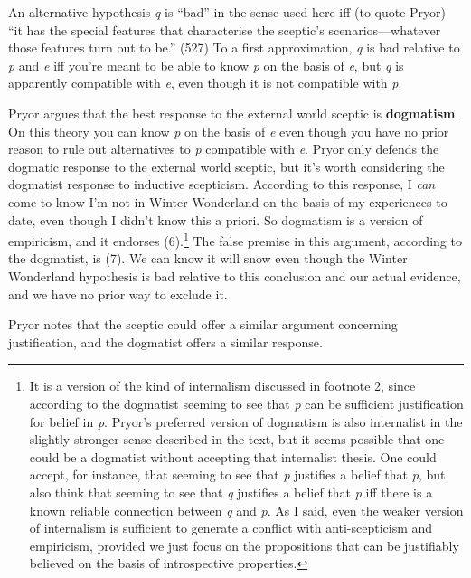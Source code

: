 \documentclass[
  11pt,
  letterpaper,
  DIV=11,
  numbers=noendperiod,
  twoside]{scrartcl}
\begin{document}
An alternative hypothesis \emph{q} is ``bad'' in the sense used here iff
(to quote Pryor) ``it has the special features that characterise the
sceptic's scenarios---whatever those features turn out to be.'' (527) To
a first approximation, \emph{q} is bad relative to \emph{p} and \emph{e}
iff you're meant to be able to know \emph{p} on the basis of \emph{e},
but \emph{q} is apparently compatible with \emph{e}, even though it is
not compatible with \emph{p}.

Pryor argues that the best response to the external world sceptic is
\textbf{dogmatism}. On this theory you can know \emph{p} on the basis of
\emph{e} even though you have no prior reason to rule out alternatives
to \emph{p} compatible with \emph{e}. Pryor only defends the dogmatic
response to the external world sceptic, but it's worth considering the
dogmatist response to inductive scepticism. According to this response,
I \emph{can} come to know I'm not in Winter Wonderland on the basis of
my experiences to date, even though I didn't know this a priori. So
dogmatism is a version of empiricism, and it endorses (6).\footnote{It
  is a version of the kind of internalism discussed in footnote 2, since
  according to the dogmatist seeming to see that \emph{p} can be
  sufficient justification for belief in \emph{p}. Pryor's preferred
  version of dogmatism is also internalist in the slightly stronger
  sense described in the text, but it seems possible that one could be a
  dogmatist without accepting that internalist thesis. One could accept,
  for instance, that seeming to see that \emph{p} justifies a belief
  that \emph{p}, but also think that seeming to see that \emph{q}
  justifies a belief that \emph{p} iff there is a known reliable
  connection between \emph{q} and \emph{p}. As I said, even the weaker
  version of internalism is sufficient to generate a conflict with
  anti-scepticism and empiricism, provided we just focus on the
  propositions that can be justifiably believed on the basis of
  introspective properties.} The false premise in this argument,
according to the dogmatist, is (7). We can know it will snow even though
the Winter Wonderland hypothesis is bad relative to this conclusion and
our actual evidence, and we have no prior way to exclude it.

Pryor notes that the sceptic could offer a similar argument concerning
justification, and the dogmatist offers a similar response.
\end{document}
